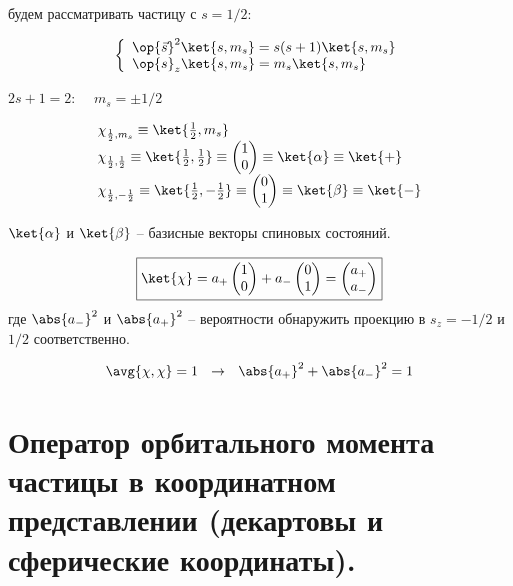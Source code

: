 будем рассматривать частицу с $s = 1/2$:

\begin{equation}
\label{eq:8_3_1}
\left\{
\begin{array}{l}
\op{\vec{s}}^2 \ket{s, m_s} = s(s+1) \ket{s, m_s}\\
\op{s}_z \ket{s, m_s} = m_s \ket{s, m_s}
\end{array}
\right.
\end{equation}

$2s + 1 = 2$:~~ $m_s = \pm 1/2$

\begin{equation}
\label{eq:8_3_2}
  \begin{array}{l}
  \chi_{\frac{1}{2}, m_s} \equiv \ket{\frac{1}{2}, m_s}\\
  \chi_{\frac{1}{2}, \frac{1}{2}} \equiv \ket{\frac{1}{2}, \frac{1}{2}} \equiv \begin{pmatrix} 1 \\ 0 \end{pmatrix}    \equiv \ket{\alpha} \equiv \ket{+}\\
  \chi_{\frac{1}{2}, -\frac{1}{2}} \equiv \ket{\frac{1}{2}, -\frac{1}{2}} \equiv \begin{pmatrix} 0 \\ 1 \end{pmatrix}   \equiv \ket{\beta} \equiv \ket{-}
\end{array}
\end{equation}

$\ket{\alpha}$ и $\ket{\beta}$ -- базисные векторы спиновых состояний.

\begin{equation}
\label{eq:8_3_3}
\boxed{
	\ket{\chi} = a_{+} \begin{pmatrix} 1 \\ 0 \end{pmatrix} + a_{-} \begin{pmatrix} 0 \\ 1 \end{pmatrix} = \begin{pmatrix} a_{+} \\ a_{-} \end{pmatrix}
}
\end{equation}
где $\abs{a_{-}}^2$ и $\abs{a_{+}}^2$ -- вероятности обнаружить проекцию в $s_z = -1/2$ и $1/2$ соответственно.

$$
\avg{\chi, \chi} = 1 ~~\rightarrow ~~ \abs{a_{+}}^2 + \abs{a_{-}}^2 = 1
$$

\section{Оператор орбитального момента частицы в координатном представлении (декартовы и сферические координаты).}

